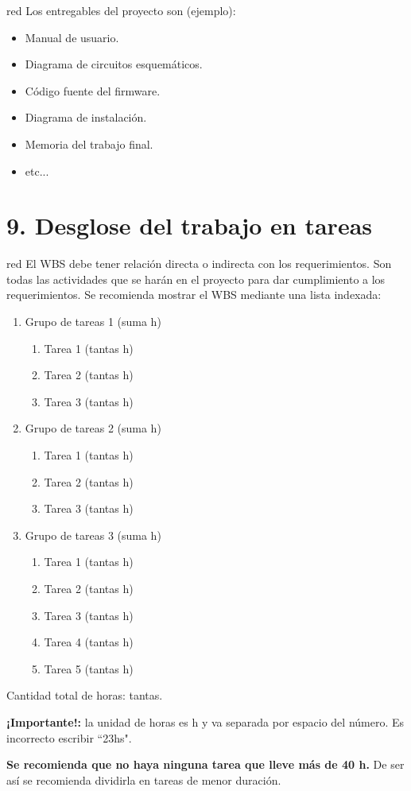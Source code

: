 \documentclass[
11pt, %
codirector, %
]{charter}
\begin{document}
\begin{consigna}{red}
Los entregables del proyecto son (ejemplo):

\begin{itemize}
	\item Manual de usuario.
	\item Diagrama de circuitos esquemáticos.
	\item Código fuente del firmware.
	\item Diagrama de instalación.
	\item Memoria del trabajo final.
	\item etc...
\end{itemize}
\end{consigna}

\section{9. Desglose del trabajo en tareas}
\label{sec:wbs}

\begin{consigna}{red}
El WBS debe tener relación directa o indirecta con los requerimientos.  Son todas las actividades que se harán en el proyecto para dar cumplimiento a los requerimientos. Se recomienda mostrar el WBS mediante una lista indexada:

\begin{enumerate}
\item Grupo de tareas 1 (suma h)
	\begin{enumerate}
	\item Tarea 1 (tantas h)
	\item Tarea 2 (tantas h)
	\item Tarea 3 (tantas h)
	\end{enumerate}
\item Grupo de tareas 2 (suma h)
	\begin{enumerate}
	\item Tarea 1 (tantas h)
	\item Tarea 2 (tantas h)
	\item Tarea 3 (tantas h)
	\end{enumerate}
\item Grupo de tareas 3 (suma h)
	\begin{enumerate}
	\item Tarea 1 (tantas h)
	\item Tarea 2 (tantas h)
	\item Tarea 3 (tantas h)
	\item Tarea 4 (tantas h)
	\item Tarea 5 (tantas h)
	\end{enumerate}
\end{enumerate}

Cantidad total de horas: tantas.

\textbf{¡Importante!:} la unidad de horas es h y va separada por espacio del número. Es incorrecto escribir ``23hs".

\textbf{Se recomienda que no haya ninguna tarea que lleve más de 40 h.} De ser así se recomienda dividirla en tareas de menor duración.

\end{consigna}
\end{document}
